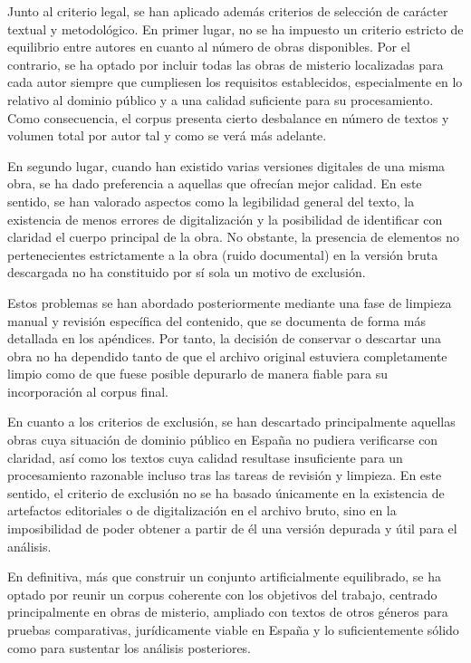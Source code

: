 \documentclass[IB]{TFUOC}%
\begin{document}
Junto al criterio legal, se han aplicado además criterios de selección de carácter textual y metodológico. En primer lugar, no se ha impuesto un criterio estricto de equilibrio entre autores en cuanto al número de obras disponibles. Por el contrario, se ha optado por incluir todas las obras de misterio localizadas para cada autor siempre que cumpliesen los requisitos establecidos, especialmente en lo relativo al dominio público y a una calidad suficiente para su procesamiento. Como consecuencia, el corpus presenta cierto desbalance en número de textos y volumen total por autor tal y como se verá más adelante.

En segundo lugar, cuando han existido varias versiones digitales de una misma obra, se ha dado preferencia a aquellas que ofrecían mejor calidad. En este sentido, se han valorado aspectos como la legibilidad general del texto, la existencia de menos errores de digitalización y la posibilidad de identificar con claridad el cuerpo principal de la obra. No obstante, la presencia de elementos no pertenecientes estrictamente a la obra (ruido documental) en la versión bruta descargada no ha constituido por sí sola un motivo de exclusión.

Estos problemas se han abordado posteriormente mediante una fase de limpieza manual y revisión específica del contenido, que se documenta de forma más detallada en los apéndices. Por tanto, la decisión de conservar o descartar una obra no ha dependido tanto de que el archivo original estuviera completamente limpio como de que fuese posible depurarlo de manera fiable para su incorporación al corpus final.

En cuanto a los criterios de exclusión, se han descartado principalmente aquellas obras cuya situación de dominio público en España no pudiera verificarse con claridad, así como los textos cuya calidad resultase insuficiente para un procesamiento razonable incluso tras las tareas de revisión y limpieza. En este sentido, el criterio de exclusión no se ha basado únicamente en la existencia de artefactos editoriales o de digitalización en el archivo bruto, sino en la imposibilidad de poder obtener a partir de él una versión depurada y útil para el análisis.

En definitiva, más que construir un conjunto artificialmente equilibrado, se ha optado por reunir un corpus coherente con los objetivos del trabajo, centrado principalmente en obras de misterio, ampliado con textos de otros géneros para pruebas comparativas, jurídicamente viable en España y lo suficientemente sólido como para sustentar los análisis posteriores.
\end{document}
